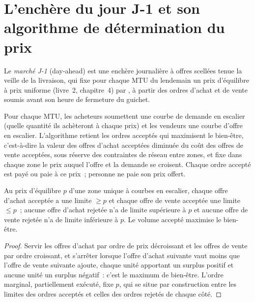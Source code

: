 \section{L'enchère du jour J-1 et son algorithme de détermination du prix}

\begin{definition}[Marché J-1]\label{def:m3:power-markets-design:da}
Le \emph{marché J-1} (day-ahead) est une enchère journalière à offres scellées
tenue la veille de la livraison, qui fixe pour chaque MTU du lendemain un
prix d'équilibre à prix uniforme (livre~2, chapitre~4) par , à partir des ordres
d'achat et de vente soumis avant son heure de fermeture du guichet.
\end{definition}

Pour chaque MTU, les acheteurs soumettent une courbe de demande en escalier (quelle quantité ils achèteront à chaque
prix) et les vendeurs une courbe d'offre en escalier. L'algorithme retient les ordres acceptés
qui maximisent le bien-être, c'est-à-dire la valeur des offres d'achat acceptées diminuée du coût des
offres de vente acceptées, sous réserve des contraintes de réseau entre zones, et fixe dans chaque zone le
prix auquel l'offre et la demande se croisent. Chaque ordre accepté est payé ou paie à
ce prix~; personne ne paie son prix offert.

\begin{proposition}\label{prop:m3:power-markets-design:support}
Au prix d'équilibre $p$ d'une zone unique à courbes en escalier, chaque offre d'achat acceptée a une limite
$\ge p$ et chaque offre de vente acceptée une limite $\le p$~; aucune offre d'achat rejetée n'a de limite
supérieure à $p$ et aucune offre de vente rejetée n'a de limite inférieure à $p$. Le volume accepté maximise le bien-être.
\end{proposition}

\begin{proof}
Servir les offres d'achat par ordre de prix décroissant et les offres de vente par ordre croissant, et s'arrêter lorsque
l'offre d'achat suivante vaut moins que l'offre de vente suivante ajoute, chaque unité apportant un surplus positif et aucune
unité un surplus négatif~: c'est le maximum de bien-être. L'ordre marginal, partiellement
exécuté, fixe $p$, qui se situe par construction entre les limites des ordres acceptés et celles des
ordres rejetés de chaque côté.
\end{proof}

